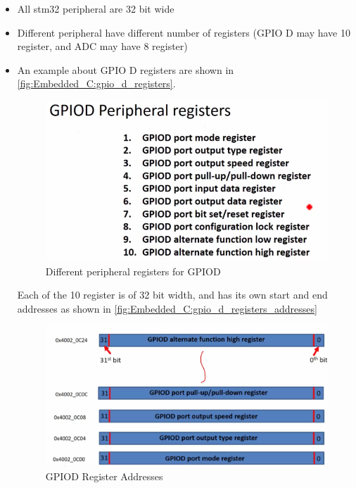 \begin{itemize}
    \item All stm32 peripheral are 32 bit wide
    
    \item Different peripheral have different number of registers (GPIO D may have 10 register, and ADC may have 8 register)
    
    \item An example about GPIO D registers are shown in \autoref{fig:Embedded_C:gpio_d_registers}.
    
\begin{figure}[h]
\centering
\includegraphics[scale=0.7]{Figures/Embedded_C/gpio_d_registers}
\caption{Different peripheral registers for GPIOD}
\label{fig:Embedded_C:gpio_d_registers}
\end{figure}    
    
Each of the 10 register is of 32 bit width, and has its own start and end addresses as shown in \autoref{fig:Embedded_C:gpio_d_registers_addresses}

\begin{figure}[h]
\centering
\includegraphics[scale=0.7]{Figures/Embedded_C/gpio_d_registers_addresses}
\caption{GPIOD Register Addresses}
\label{fig:Embedded_C:gpio_d_registers_addresses}
\end{figure}  


\end{itemize}
